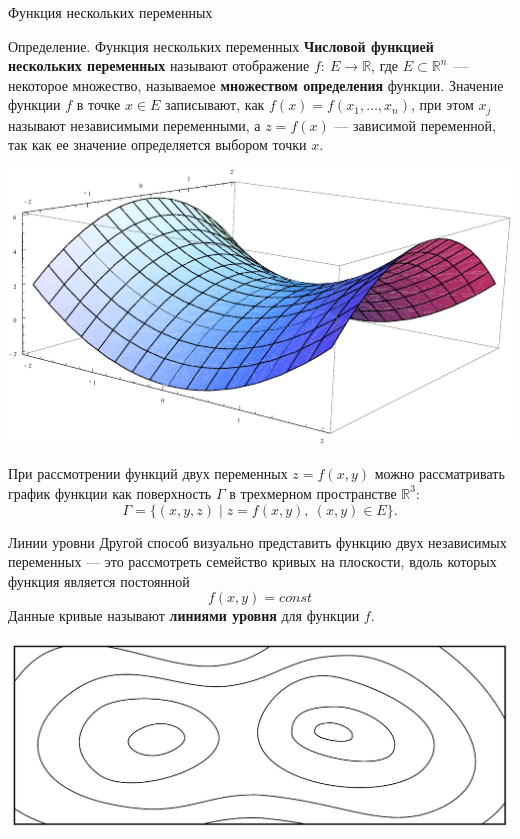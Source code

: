 \documentclass[8pt]{beamer}
\begin{document}
\begin{frame}{Функция нескольких переменных}
\begin{block}{Определение. Функция нескольких переменных}
{\bf Числовой функцией нескольких переменных} называют отображение $f:\ E\to \mathbb{R}$, где $E\subset\mathbb{R}^n$~--- некоторое множество, называемое {\bf множеством определения} функции. Значение функции $f$ в точке $x\in E$ записывают, как $f(x) = f(x_1,\ldots, x_n)$, при этом $x_j$ называют независимыми переменными, а $z=f(x)$ --- зависимой переменной, так как ее значение определяется выбором точки $x$.
\end{block}
\begin{center}
\includegraphics[scale=0.8]{Plot3D.pdf}
\end{center}
При рассмотрении функций двух переменных $z=f(x,y)$ можно рассматривать график функции как поверхность $\Gamma$ в трехмерном пространстве $\mathbb{R}^3$:
$$\Gamma = \{(x,y,z)\mid z=f(x,y),\ (x,y)\in E\}.$$
\end{frame}

\begin{frame}{Линии уровни}
Другой способ визуально представить функцию двух независимых переменных --- это рассмотреть семейство кривых на плоскости, вдоль которых функция является постоянной
$$f(x,y) = const$$
Данные кривые называют {\bf линиями уровня} для функции $f$.
\begin{center}
\includegraphics[scale=0.5]{cp.pdf}
\end{center}
\end{frame}
\end{document}
